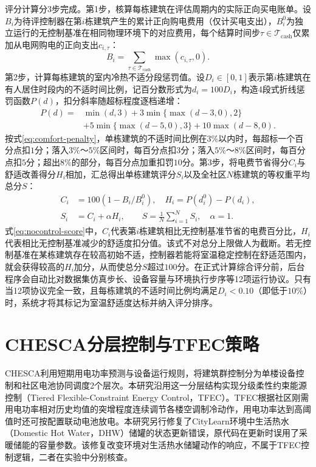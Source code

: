评分计算分3步完成。第1步，核算每栋建筑在评估周期内的实际正向买电账单。设$B_i$为待评控制器在第$i$栋建筑产生的累计正向购电费用（仅计买电支出），$B_i^0$为独立运行的无控制基准在相同物理环境下的对应费用，每个结算时间步$\tau\in\mathcal{T}_{\mathrm{cash}}$仅累加从电网购电的正向支出$c_{i,\tau}$：
\begin{equation}
    \label{eq:positive-bill}
    B_i=\sum_{\tau\in\mathcal{T}_{\mathrm{cash}}}\max(c_{i,\tau},0).
\end{equation}
第2步，计算每栋建筑的室内冷热不适分段惩罚值。设$D_i\in[0,1]$表示第$i$栋建筑在有人居住时段内的不适时间比例，记百分数形式为$d_i=100D_i$，构造4段式折线惩罚函数$P(d)$，扣分斜率随超标程度逐档递增：
\begin{equation}
    \label{eq:comfort-penalty}
    \begin{aligned}
        P(d)={} & \min(d,3)+3\min\{\max(d-3,0),2\}       \\
                & +5\min\{\max(d-5,0),3\}+10\max(d-8,0).
    \end{aligned}
\end{equation}
按式\eqref{eq:comfort-penalty}，单栋建筑的不适时间比例在$3\%$以内时，每超标一个百分点扣$1$分；落入$3\%$～$5\%$区间时，每百分点扣$3$分；落入$5\%$～$8\%$区间时，每百分点扣$5$分；超出$8\%$的部分，每百分点加重扣罚$10$分。第3步，将电费节省得分$C_i$与舒适改善得分$H_i$相加，汇总得出单栋建筑评分$S_i$以及全社区$N$栋建筑的等权重平均总分$S$：
\begin{equation}
    \label{eq:nocontrol-score}
    \begin{aligned}
        C_i & =100(1-B_i/B_i^0),\quad
        H_i=P(d_i^0)-P(d_i),          \\
        S_i & =C_i+\alpha H_i,\qquad
        S=\frac{1}{N}\sum_{i=1}^{N}S_i,\quad \alpha=1.
    \end{aligned}
\end{equation}
式\eqref{eq:nocontrol-score}中，$C_i$代表第$i$栋建筑相比无控制基准节省的电费百分比，$H_i$代表相比无控制基准减少的舒适度扣分值。该式不对总分上限做人为截断。若无控制基准在某栋建筑存在较高初始不适，控制器若能将室温稳定控制在舒适范围内，就会获得较高的$H_i$加分，从而使总分$S$超过$100$分。在正式计算综合评分前，后台程序会自动比对数据集仿真步长、设备容量与环境执行步序等12项运行协议。只有当12项协议完全一致，且每栋建筑的不适时间比例均满足$D_i<0.10$（即低于$10\%$）时，系统才将其标记为室温舒适度达标并纳入评分排序。

\section{CHESCA分层控制与TFEC策略}\label{sec:chesca-method}
CHESCA利用短期用电功率预测与设备运行规则，将建筑群控制分为单楼设备控制和社区电池协同调度2个层次。本研究沿用这一分层结构实现分级柔性约束能源控制（Tiered Flexible-Constraint Energy Control，TFEC）。TFEC根据社区刚需用电功率相对历史均值的突增程度连续调节各楼空调制冷动作，用电功率达到高阈值时还可按配置联动电池放电。本研究另行修复了CityLearn环境中生活热水（Domestic Hot Water，DHW）储罐的状态更新错误，原代码在更新时误用了采暖储能的容量参数。该修复改变环境对生活热水储罐动作的响应，不属于TFEC控制逻辑，二者在实验中分别核查。

